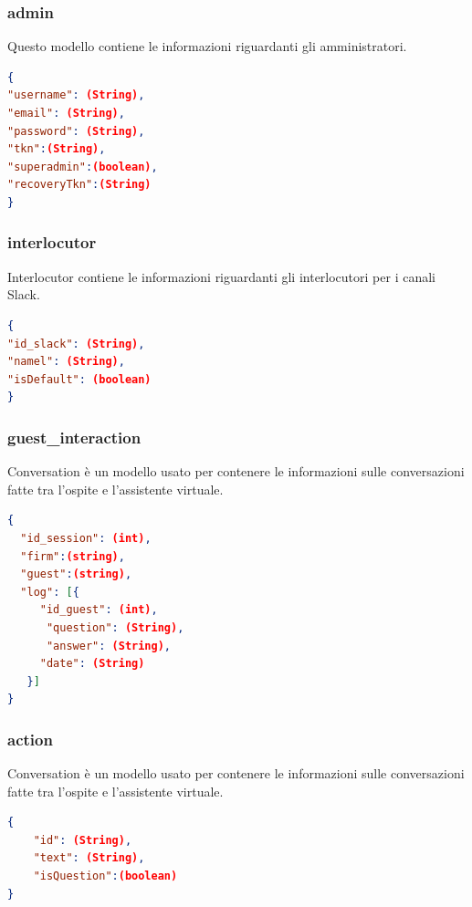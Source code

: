 \documentclass[../DefinizioneDiProdotto_v3.0.0.tex]{subfiles}
\begin{document}
\subsubsection{admin}
Questo modello contiene le informazioni riguardanti gli amministratori.
\begin{lstlisting}[language=json,firstnumber=1]
{
"username": (String),
"email": (String),
"password": (String),
"tkn":(String),
"superadmin":(boolean),
"recoveryTkn":(String)
}
\end{lstlisting}

\subsubsection{interlocutor}
Interlocutor contiene le informazioni riguardanti gli interlocutori per i canali Slack.
\begin{lstlisting}[language=json,firstnumber=1]
{
"id_slack": (String),
"namel": (String),
"isDefault": (boolean)
}
\end{lstlisting}

\subsubsection{guest\_interaction}
Conversation è un modello usato per contenere le informazioni sulle conversazioni fatte tra l'ospite e l'assistente virtuale.
\begin{lstlisting}[language=json,firstnumber=1]
{
  "id_session": (int),
  "firm":(string),
  "guest":(string),
  "log": [{
     "id_guest": (int),
      "question": (String),
      "answer": (String),
     "date": (String)
   }]
}
\end{lstlisting}

\subsubsection{action}
Conversation è un modello usato per contenere le informazioni sulle conversazioni fatte tra l'ospite e l'assistente virtuale.
\begin{lstlisting}[language=json,firstnumber=1]
{
	"id": (String),
	"text": (String),
	"isQuestion":(boolean)
}
\end{lstlisting}
\end{document}
